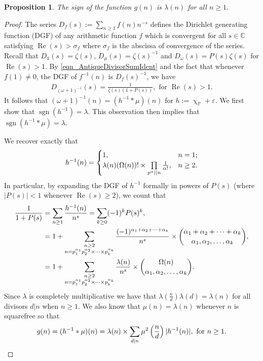 \documentclass[11pt,reqno,a4letter]{article}
\numberwithin{equation}{section}
\numberwithin{figure}{section}
\numberwithin{table}{section}
\newcommand{\cf}{\textit{cf.\ }}
\renewcommand{\chi}{\upchi}
\theoremstyle{plain}
\newtheorem{prop}[theorem]{Proposition}
\numberwithin{theorem}{section}
\theoremstyle{definition}
\renewcommand{\Re}{\operatorname{Re}}
\begin{document}
\begin{prop}
\label{prop_SignageDirInvsOfPosBddArithmeticFuncs_v1} 
The sign of the function $g(n)$ is $\lambda(n)$ for all $n \geq 1$. 
\end{prop} 
\begin{proof} 
The series $D_f(s) := \sum_{n \geq 1} f(n) n^{-s}$ defines the 
Dirichlet generating function (DGF) of any 
arithmetic function $f$ which is convergent for all $s \in \mathbb{C}$ satisfying 
$\Re(s) > \sigma_f$ where $\sigma_f$ is the abscissa of convergence of the series. 
Recall that $D_{\mathds{1}}(s) = \zeta(s)$, $D_{\mu}(s) = \zeta(s)^{-1}$ and 
$D_{\omega}(s) = P(s) \zeta(s)$ for $\Re(s) > 1$. 
By \eqref{eqn_AntiqueDivisorSumIdent} and the fact that whenever $f(1) \neq 0$, 
the DGF of $f^{-1}(n)$ is $D_f(s)^{-1}$, we have 
\begin{align} 
\label{eqn_DGF_of_gInvn} 
D_{(\omega+1)^{-1}}(s) = \frac{1}{\zeta(s) (1+P(s))}, \text{ for } \Re(s) > 1. 
\end{align} 
It follows that $(\omega + 1)^{-1}(n) = (h^{-1} \ast \mu)(n)$ for 
$h := \chi_{\mathbb{P}} + \varepsilon$. 
We first show that $\operatorname{sgn}(h^{-1}) = \lambda$. 
This observation then implies that 
$\operatorname{sgn}(h^{-1} \ast \mu) = \lambda$. 

We recover exactly that \cite[\cf \S 2]{FROBERG-1968} 
\begin{equation} 
\notag 
h^{-1}(n) = \begin{cases} 
     1, & n = 1; \\ 
     \lambda(n) (\Omega(n))! \times \prod\limits_{p^{\alpha} || n} \frac{1}{\alpha!}, & n \geq 2. 
     \end{cases}
\end{equation} 
In particular, by expanding the DGF of 
$h^{-1}$ formally in powers of $P(s)$ (where $|P(s)| < 1$ whenever $\Re(s) \geq 2$), 
we count that 
\begin{align}
\notag
\frac{1}{1+P(s)} & = \sum_{n \geq 1} \frac{h^{-1}(n)}{n^s} = \sum_{k \geq 0} (-1)^k P(s)^k, \\ 
\notag
     & = 
     1 + \sum_{\substack{n \geq 2 \\ n =p_1^{\alpha_1}p_2^{\alpha_2} \times \cdots \times p_k^{\alpha_k}}} 
     \frac{(-1)^{\alpha_1+\alpha_2+\cdots+\alpha_k}}{n^s} \times 
     \binom{\alpha_1+\alpha_2+\cdots+\alpha_k}{\alpha_1,\alpha_2,\ldots,\alpha_k}, \\ 
\label{eqn_COmeganMultinomExp_as_DGFSeries_v2}
     & = 
     1 + \sum_{\substack{n \geq 2 \\ n =p_1^{\alpha_1}p_2^{\alpha_2} \times \cdots \times p_k^{\alpha_k}}} 
     \frac{\lambda(n)}{n^s} \times \binom{\Omega(n)}{\alpha_1,\alpha_2,\ldots,\alpha_k}. 
\end{align}
Since $\lambda$ is completely multiplicative we have that 
$\lambda\left(\frac{n}{d}\right) \lambda(d) = \lambda(n)$ for all divisors 
$d|n$ when $n \geq 1$. We also know that $\mu(n) = \lambda(n)$ whenever $n$ is squarefree so that
\[
g(n) = (h^{-1} \ast \mu)(n) = \lambda(n) \times 
     \sum_{d|n} \mu^2\left(\frac{n}{d}\right) |h^{-1}(n)|, \text{ for } n \geq 1. 
     \qedhere 
\]
\end{proof} 
\end{document}
